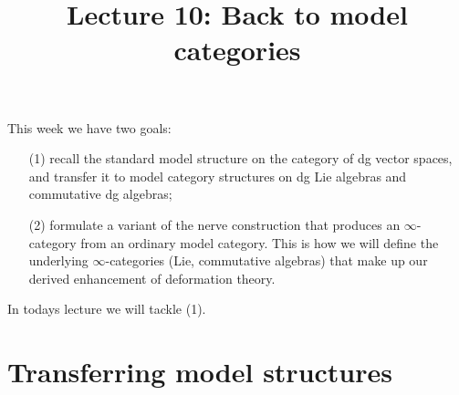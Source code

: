 \documentclass[11pt]{amsart}
\title{Lecture 10: Back to model categories}
\begin{document}
\maketitle

This week we have two goals: 
\begin{itemize}
\item[(1)] recall the standard model structure on the category of dg vector spaces, and transfer it to model category structures on dg Lie algebras and commutative dg algebras;
\item[(2)] formulate a variant of the nerve construction that produces an $\infty$-category from an ordinary model category. 
This is how we will define the underlying $\infty$-categories (Lie, commutative algebras) that make up our derived enhancement of deformation theory. 
\end{itemize}

In todays lecture we will tackle (1). 

\section{Transferring model structures}
\end{document}
